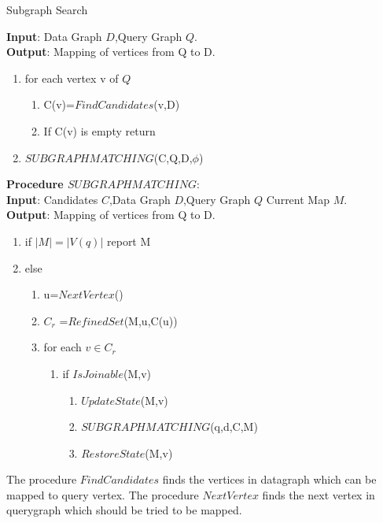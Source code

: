\begin{breakablealgorithm}[H]
\caption{Subgraph Search}
\label{Graph Isomorphism}
\textbf{Input}: Data Graph $D$,Query Graph $Q$.\\
\textbf{Output}: Mapping of vertices from Q to D.\\
\begin{algorithmic}
 \item \begin{enumerate}
\item for each vertex v of $Q$ 
 \begin{enumerate}
\item C(v)=$FindCandidates$(v,D)
\item If C(v) is empty return 
\end{enumerate}
\item $SUBGRAPHMATCHING$(C,Q,D,$\phi$)
\end{enumerate}
\end{algorithmic}
\textbf{Procedure $SUBGRAPHMATCHING$}:\\
\textbf{Input}: Candidates $C$,Data Graph $D$,Query Graph $Q$ Current Map $M$.\\
\textbf{Output}: Mapping of vertices from Q to D.\\
\begin{algorithmic}
\item \begin{enumerate}
\item if $|M| = |V(q)| $ report M 
\item else
 \begin{enumerate}
\item u=$NextVertex$()
\item $ C_r $ =$RefinedSet$(M,u,C(u))  
\item for each $v \in C_r$ 
 \begin{enumerate}
\item if $IsJoinable$(M,v)
 \begin{enumerate}
\item $UpdateState$(M,v)
\item $SUBGRAPHMATCHING$(q,d,C,M)
\item $RestoreState$(M,v)
\end{enumerate}
\end{enumerate}
\end{enumerate}
\end{enumerate}
\end{algorithmic}
\end{breakablealgorithm}
\hspace{10mm}The procedure $FindCandidates$ finds the vertices in datagraph which can be mapped to query vertex. The procedure $NextVertex$ finds the next vertex in querygraph which should be tried to be mapped.

